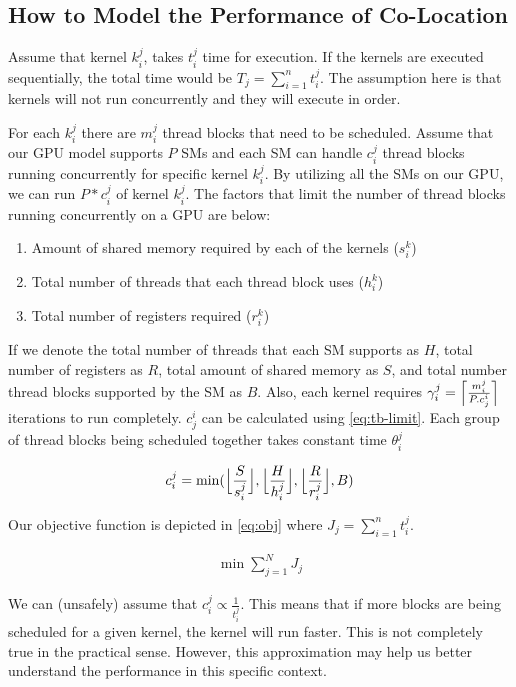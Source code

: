 \documentclass[11pt]{article}
\newcommand{\floor}[1] {\Bigl\lfloor{#1}\Bigr\rfloor}
\newcommand{\ceil}[1] {\Bigl\lceil{#1}\Bigr\rceil}
\begin{document}
\subsection{How to Model the Performance of Co-Location}

Assume that kernel $k^j_i$, takes $t^j_i$ time for execution. If the kernels are
executed sequentially, the total time would be $T_j=\sum_{i=1}^n t^j_i$. The
assumption here is that kernels will not run concurrently and they will execute
in order.

For each $k^j_i$ there are $m^j_i$ thread blocks that need to be scheduled.
Assume that our GPU model supports $P$ SMs and each SM can handle $c^j_i$ thread
blocks running concurrently for specific kernel $k^j_i$. By utilizing all the
SMs on our GPU, we can run $P*c^j_i$ of kernel $k^j_i$. The factors that limit
the number of thread blocks running concurrently on a GPU are below:

\begin{enumerate}
    \item Amount of shared memory required by each of the kernels ($s^k_i$)
    \item Total number of threads that each thread block uses ($h^k_i$)
    \item Total number of registers required ($r^k_i$)
\end{enumerate}

If we denote the total number of threads that each SM supports as $H$, total
number of registers as $R$, total amount of shared memory as $S$, and total
number thread blocks supported by the SM as $B$. Also, each kernel requires
$\gamma^j_i=\ceil{\frac{m^j_i}{P.c_j^i}}$  iterations to run completely.  $c_j^i$ can be
calculated using \cref{eq:tb-limit}. Each group of thread blocks being scheduled
together takes constant time $\theta^j_i$

\begin{align}
    c^j_i = \min (\floor{\frac{S}{s^j_i}}, \floor{\frac{H}{h^j_i}},
    \floor{\frac{R}{r^j_i}}, B)
    \label{eq:tb-limit}
\end{align}

Our objective function is depicted in \cref{eq:obj} where $J_j=\sum_{i=1}^n
t^j_i$.

\begin{align}
    \min \sum_{j=1}^N J_j
    \label{eq:obj}
\end{align}


We can (unsafely) assume that $c^j_i \propto \frac{1}{t^j_i}$. This means that
if more blocks are being scheduled for a given kernel, the kernel will run
faster. This is not completely true in the practical sense. However, this
approximation may help us better understand the performance in this specific
context.
\end{document}
